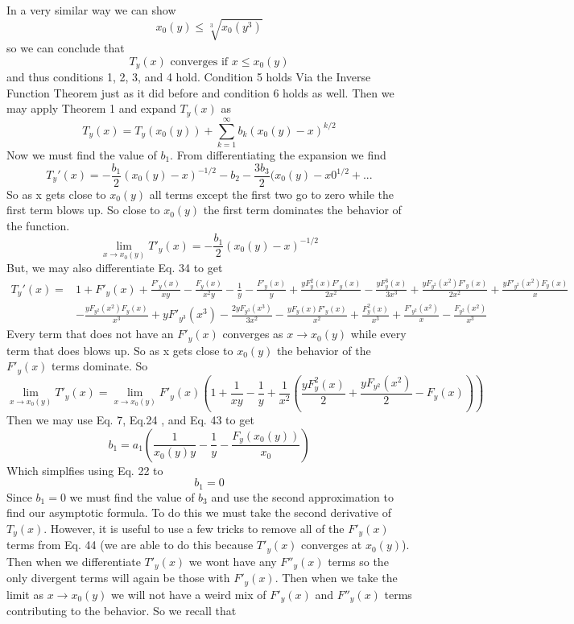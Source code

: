 \documentclass{article}
\begin{document}
In a very similar way we can show 
\[x_0(y) \leq \sqrt[3]{x_0(y^3)}\]
so we can conclude that 
\[T_y(x) \text{ converges if } x \leq x_0(y)\]
and thus conditions 1, 2, 3, and 4 hold. Condition 5 holds Via the Inverse Function Theorem just as it did before and condition 6 holds as well. 
Then we may apply Theorem 1 and expand \(T_y(x)\) as
\begin{equation}
T_y(x)=T_y(x_0(y))+\sum_{k=1}^\infty b_k (x_0(y)-x)^{k/2}
\end{equation}
 Now we must find the value of \(b_1\). From differentiating the expansion we find
\begin{equation}
T_y'(x)=-\frac{b_1}{2}(x_0(y)-x)^{-1/2}-b_2-\frac{3b_3}{2}(x_0(y)-x0^{1/2}+...
\end{equation}
So as x gets close to \(x_0(y)\) all terms except the first two go to zero while the first term blows up. So close to \(x_0(y)\) the first term dominates the behavior of the function.
\begin{equation}
\lim_{x \to x_0(y)}T'_y(x) = -\frac{b_1}{2}(x_0(y)-x)^{-1/2}
\end{equation}
But, we may also differentiate Eq. 34 to get
\begin{align}
T_y'(x)=&1+F'_y(x)+\frac{F'_y(x)}{xy}-\frac{F_y(x)}{x^2y}-\frac{1}{y}-\frac{F'_y(x)}{y}+\frac{yF_y^2(x)F'_y(x)}{2x^2}-\frac{yF_y^3(x)}{3x^3}+\frac{yF_{y^2}(x^2)F'_y(x)}{2x^2}+\frac{yF'_{y^2}(x^2)F_y(x)}{x} \nonumber \\
&-\frac{yF_{y^2}(x^2)F_y(x)}{x^3}+ yF'_{y^3}(x^3)-\frac{2yF_{y^3}(x^3)}{3x^2}-\frac{yF_y(x)F'_y(x)}{x^2}+\frac{F_y^2(x)}{x^3}+\frac{F'_{y^2}(x^2)}{x}-\frac{F_{y^2}(x^2)}{x^3}
\end{align}  
Every term that does not have an \(F'_y(x)\) converges as \(x \to x_0(y)\) while every term that does blows up. So as x gets close to \(x_0(y)\) the behavior of the \(F'_y(x)\) terms dominate. So
\begin{equation}
\lim_{x \to x_0(y)} T'_y(x) =\lim_{x \to x_0(y)} F'_y(x)\left(1+\frac{1}{xy}-\frac{1}{y}+\frac{1}{x^2}\left(\frac{yF_y^2(x)}{2}+\frac{yF_{y^2}(x^2)}{2}-F_y(x)\right)\right)
\end{equation}
Then we may use Eq. 7, Eq.24 , and Eq. 43 to get
\[b_1=a_1\left(\frac{1}{x_0(y)y}-\frac{1}{y}-\frac{F_y(x_0(y))}{x_0}\right)\]
Which simplfies using Eq. 22 to 
\begin{equation}
b_1=0
\end{equation}
Since \(b_1=0\) we must find the value of \(b_3\) and use the second approximation to find our asymptotic formula. To do this we must take the second derivative of \(T_y(x)\). However, it is useful to use a few tricks to remove all of the \(F'_y(x)\) terms from Eq. 44 (we are able to do this because \(T'_y(x)\) converges at \(x_0(y)\)). Then when we differentiate  \(T'_y(x)\) we wont have any \(F''_y(x)\) terms so the only divergent terms will again be those with \(F'_y(x)\). Then when we take the limit as \(x \to x_0(y)\) we will not have a weird mix of \(F'_y(x)\) and \(F''_y(x)\) terms contributing to the behavior. So we recall that
\end{document}
